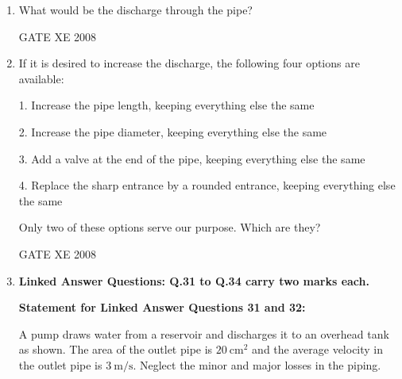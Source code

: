 \documentclass[12pt]{article}
\begin{document}
\begin{enumerate}
\item What would be the discharge through the pipe?  

\begin{enumerate}
\end{enumerate}

GATE XE 2008

\item If it is desired to increase the discharge, the following four options are available:  

1. Increase the pipe length, keeping everything else the same  

2. Increase the pipe diameter, keeping everything else the same  

3. Add a valve at the end of the pipe, keeping everything else the same 

4. Replace the sharp entrance by a rounded entrance, keeping everything else the same  

Only two of these options serve our purpose. Which are they?  

\begin{enumerate}
\end{enumerate}

GATE XE 2008

\item[] \textbf{\Large Linked Answer Questions: Q.31 to Q.34 carry two marks each.}

\textbf{Statement for Linked Answer Questions 31 and 32:}  

A pump draws water from a reservoir and discharges it to an overhead tank as shown.  
The area of the outlet pipe is $20 \ \text{cm}^2$ and the average velocity in the outlet pipe is $3 \ \text{m/s}$.  
Neglect the minor and major losses in the piping.  


\end{enumerate}
\end{document}
